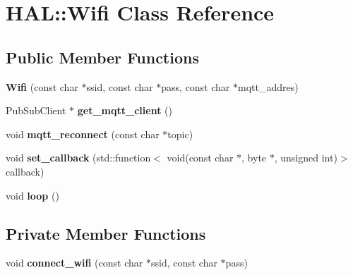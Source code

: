 \hypertarget{class_h_a_l_1_1_wifi}{}\section{H\+AL\+:\+:Wifi Class Reference}
\label{class_h_a_l_1_1_wifi}
\subsection*{Public Member Functions}
\begin{DoxyCompactItemize}
\item 
\mbox{\label{class_h_a_l_1_1_wifi_a3bb32ff1c8aa166b399539d06a677920}} 
{\bfseries Wifi} (const char $\ast$ssid, const char $\ast$pass, const char $\ast$mqtt\+\_\+addres)
\item 
\mbox{\label{class_h_a_l_1_1_wifi_a5b620c7c9ca8a29556fa85c6eef505b3}} 
Pub\+Sub\+Client $\ast$ {\bfseries get\+\_\+mqtt\+\_\+client} ()
\item 
\mbox{\label{class_h_a_l_1_1_wifi_a0f280c378a8bc12bde5982a574817db5}} 
void {\bfseries mqtt\+\_\+reconnect} (const char $\ast$topic)
\item 
\mbox{\label{class_h_a_l_1_1_wifi_a5458230b1146e80497e6ca78bdd0438c}} 
void {\bfseries set\+\_\+callback} (std\+::function$<$ void(const char $\ast$, byte $\ast$, unsigned int)$>$ callback)
\item 
\mbox{\label{class_h_a_l_1_1_wifi_abe549376246bcaef0d61daaa61f9cf34}} 
void {\bfseries loop} ()
\end{DoxyCompactItemize}
\subsection*{Private Member Functions}
\begin{DoxyCompactItemize}
\item 
\mbox{\label{class_h_a_l_1_1_wifi_a3aaa3abf92940270b14f09a37f1cb9a6}} 
void {\bfseries connect\+\_\+wifi} (const char $\ast$ssid, const char $\ast$pass)
\end{DoxyCompactItemize}
